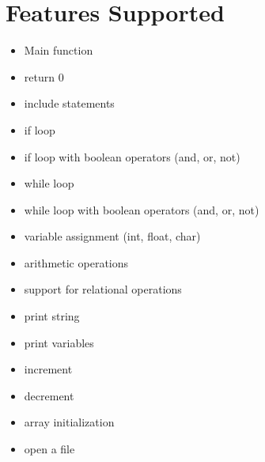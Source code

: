\documentclass{article}
\begin{document}
\newpage
\section{Features Supported}
\begin{itemize}
\item Main function
\item return 0
\item include statements
\item if loop
\item if loop with boolean operators (and, or, not)
\item while loop
\item while loop with boolean operators (and, or, not)
\item variable assignment (int, float, char)
\item arithmetic operations
\item support for relational operations
\item print string
\item print variables
\item increment
\item decrement
\item array initialization
\item open a file
\end{itemize}
\newpage
\end{document}
